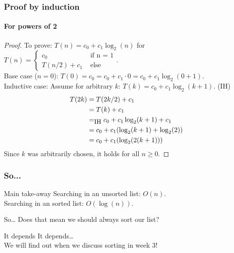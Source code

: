 \begin{frame}
	\frametitle{Proof by induction}
	\framesubtitle{For powers of 2}
	\begin{proof}
		To prove: $T(n) = c_0 + c_1 \log_2(n)$ for $T(n)= \begin{cases}
			c_0 & \text{ if n = 1}\\
			T(n/2) + c_1 & \text{ else}
		\end{cases}$.	\\
		Base case ($n=0$): $T(0) = c_0 = c_0 + c_1 \cdot 0 = c_0 + c_1\log_2(0+1)$.\\
		Inductive case:
		Assume for arbitrary $k$: $T(k) = c_0 + c_1 \log_2(k+1)$. (IH)\\
		\vspace*{-15pt}
		\begin{align*}
			T(2k) &= T(2k/2) + c_1\\
					 &= T(k) + c_1\\
					 &=_\text{\small IH} c_0 + c_1\log_2(k+1) + c_1\\
					 &= c_0 + c_1(\log_2(k+1) + \log_2(2))\\
					 &= c_0 + c_1(\log_2(2(k+1)))
		\end{align*}
		Since $k$ was arbitrarily chosen, it holds for all $n \geq 0$.
	\end{proof}
\end{frame}

\begin{frame}
	\frametitle{So...}
		\begin{block}{Main take-away}
			Searching in an unsorted list: $O(n)$.\\
			Searching in an sorted list: $O(\log(n))$.
		\end{block}	
		\pause
		\begin{block}{So\dots}
			Does that mean we should always sort our list?
		\end{block}
		\pause
		\begin{block}{It depends}
			It depends\dots\\
			We will find out when we discuss sorting in week 3!
		\end{block}
\end{frame}